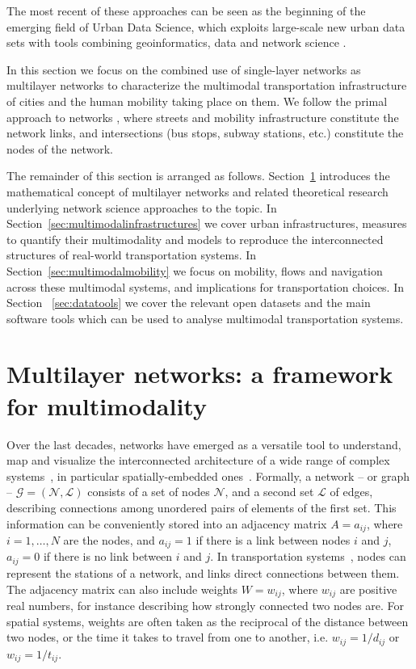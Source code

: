 The most recent of these approaches can be seen as the beginning of the emerging field of Urban Data Science, which exploits large-scale new urban data sets with tools combining geoinformatics, data and network science \cite{organizers2019roundtable,resch2019hds}.

In this section we focus on the combined use of single-layer networks as multilayer networks to characterize the multimodal transportation infrastructure of cities and the human mobility taking place on them. We follow the primal approach to networks \cite{porta2006primal}, where streets and mobility infrastructure constitute the network links, and intersections (bus stops, subway stations, etc.) constitute the nodes of the network.

The remainder of this section is arranged as follows. Section~\ref{sec:multilayernetworks} introduces the mathematical concept of multilayer networks and related theoretical research underlying network science approaches to the topic. In Section~\ref{sec:multimodalinfrastructures} we cover urban infrastructures, measures to quantify their multimodality and models to reproduce the interconnected structures of real-world transportation systems. In Section~\ref{sec:multimodalmobility} we focus on mobility, flows and navigation across these multimodal systems, and implications for transportation choices. In Section ~\ref{sec:datatools} we cover the relevant open datasets and the main software tools which can be used to analyse multimodal transportation systems. %

\section{Multilayer networks: a framework for multimodality}\label{sec:multilayernetworks}

Over the last decades, networks have emerged as a versatile tool to understand, map and visualize the interconnected architecture of a wide range of complex systems~\cite{albert2002statistical,dorogovtsev2002evolution, newman2003structure, boccaletti2006complex}, in particular spatially-embedded ones~\cite{barthelemy2011spatial}. Formally, a network -- or graph -- $\mathcal G = (\mathcal N, \mathcal L)$ consists of a set of nodes $\mathcal N$, and a second set $\mathcal L$ of edges, describing connections among unordered pairs of elements of the first set. This information can be conveniently stored into an adjacency matrix ${A=a_{ij}}$, where $i=1, \dots, N$ are the nodes, and $a_{ij}=1$ if there is a link between nodes $i$ and $j$, $a_{ij}=0$ if there is no link between $i$ and $j$. In transportation systems~\cite{lin2013complex}, nodes can represent the stations of a network, and links direct connections between them. The adjacency matrix can also include weights $W=w_{ij}$, where $w_{ij}$ are positive real numbers, for instance describing how strongly connected two nodes are. For spatial systems, weights are often taken as the reciprocal of the distance between two nodes, or the time it takes to travel from one to another, i.e. $w_{ij}=1/d_{ij}$ or $w_{ij}=1/t_{ij}$.

